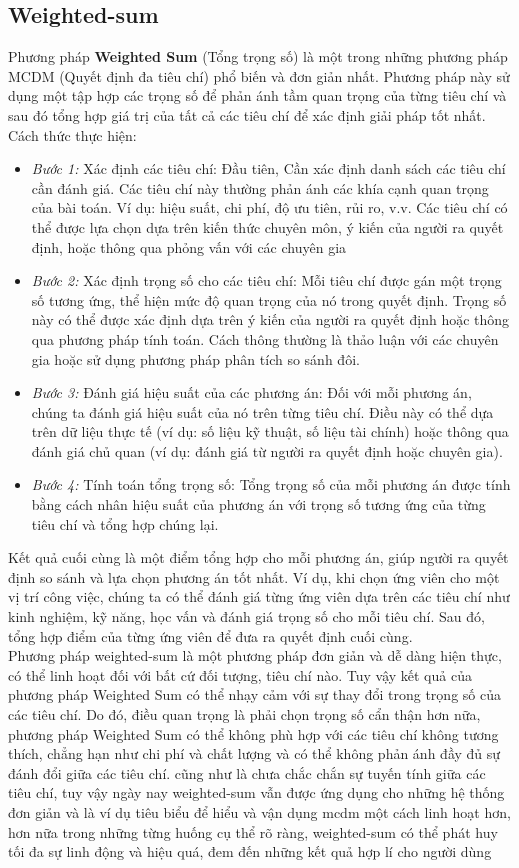 \subsection{Weighted-sum}
Phương pháp \textbf{Weighted Sum }(Tổng trọng số) là một trong những phương pháp MCDM (Quyết định đa tiêu chí) phổ biến và đơn giản nhất. Phương pháp này sử dụng một tập hợp các trọng số để phản ánh tầm quan trọng của từng tiêu chí và sau đó tổng hợp giá trị của tất cả các tiêu chí để xác định giải pháp tốt nhất.
Cách thức thực hiện:
\begin{itemize}
    \item \textit{Bước 1:} Xác định các tiêu chí:
    Đầu tiên, Cần xác định danh sách các tiêu chí cần đánh giá. Các tiêu chí này thường phản ánh các khía cạnh quan trọng của bài toán. Ví dụ: hiệu suất, chi phí, độ ưu tiên, rủi ro, v.v.
Các tiêu chí có thể được lựa chọn dựa trên kiến thức chuyên môn, ý kiến của người ra quyết định, hoặc thông qua phỏng vấn với các chuyên gia
    \item \textit{Bước 2:} Xác định trọng số cho các tiêu chí:
    Mỗi tiêu chí được gán một trọng số tương ứng, thể hiện mức độ quan trọng của nó trong quyết định.
Trọng số này có thể được xác định dựa trên ý kiến của người ra quyết định hoặc thông qua phương pháp tính toán. Cách thông thường là thảo luận với các chuyên gia hoặc sử dụng phương pháp phân tích so sánh đôi.
    \item \textit{Bước 3:} Đánh giá hiệu suất của các phương án:
    Đối với mỗi phương án, chúng ta đánh giá hiệu suất của nó trên từng tiêu chí.
Điều này có thể dựa trên dữ liệu thực tế (ví dụ: số liệu kỹ thuật, số liệu tài chính) hoặc thông qua đánh giá chủ quan (ví dụ: đánh giá từ người ra quyết định hoặc chuyên gia).
    \item \textit{Bước 4:} Tính toán tổng trọng số:
    Tổng trọng số của mỗi phương án được tính bằng cách nhân hiệu suất của phương án với trọng số tương ứng của từng tiêu chí và tổng hợp chúng lại.
\end{itemize}
Kết quả cuối cùng là một điểm tổng hợp cho mỗi phương án, giúp người ra quyết định so sánh và lựa chọn phương án tốt nhất. Ví dụ, khi chọn ứng viên cho một vị trí công việc, chúng ta có thể đánh giá từng ứng viên dựa trên các tiêu chí như kinh nghiệm, kỹ năng, học vấn và đánh giá trọng số cho mỗi tiêu chí. Sau đó, tổng hợp điểm của từng ứng viên để đưa ra quyết định cuối cùng.\\
Phương pháp weighted-sum là một phương pháp đơn giản và dễ dàng hiện thực, có thể linh hoạt đối với bất cứ đối tượng, tiêu chí nào. Tuy vậy kết quả của phương pháp Weighted Sum có thể nhạy cảm với sự thay đổi trong trọng số của các tiêu chí. Do đó, điều quan trọng là phải chọn trọng số cẩn thận hơn nữa, phương pháp Weighted Sum có thể không phù hợp với các tiêu chí không tương thích, chẳng hạn như chi phí và chất lượng và có thể không phản ánh đầy đủ sự đánh đổi giữa các tiêu chí. cũng như là chưa chắc chắn sự tuyến tính giữa các tiêu chí, tuy vậy ngày nay weighted-sum vẫn được ứng dụng cho những hệ thống đơn giản và là ví dụ tiêu biểu để hiểu và vận dụng mcdm một cách linh hoạt hơn, hơn nữa trong những từng huống cụ thể rõ ràng, weighted-sum có thể phát huy tối đa sự linh động và hiệu quá, đem đến những kết quả hợp lí cho người dùng

